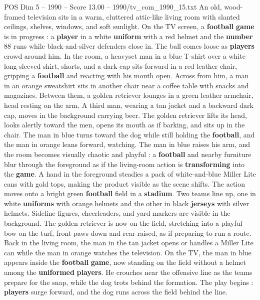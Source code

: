 \begin{textsample}{POS Dim 5 – 1990 – Score 13.00 – 1990/tv\_com\_1990\_15.txt}  \label{ex:f5_pos_007}
An old, wood-framed television sits in a warm, cluttered attic-like living room with slanted ceilings, shelves, windows, and soft sunlight.
On the TV screen, a \textbf{football} \textbf{game} is in progress : a \textbf{player} in a white \textbf{uniform} with a red helmet and the \textbf{number} 88 runs while black-and-silver defenders close in.
The ball comes loose as \textbf{players} crowd around him.
In the room, a heavyset man in a blue T-shirt over a white long-sleeved shirt, shorts, and a dark cap sits forward in a red leather chair, gripping a \textbf{football} and reacting with his mouth open.
Across from him, a man in an orange sweatshirt sits in another chair near a coffee table with snacks and magazines.
Between them, a golden retriever lounges in a green leather armchair, head resting on the arm.
A third man, wearing a tan jacket and a backward dark cap, moves in the background carrying beer.
The golden retriever lifts its head, looks alertly toward the men, opens its mouth as if barking, and sits up in the chair.
The man in blue turns toward the dog while still holding the \textbf{football}, and the man in orange leans forward, watching.
The man in blue raises his arm, and the room becomes visually chaotic and playful : a \textbf{football} and nearby furniture blur through the foreground as if the living-room action is \textbf{transforming} into the \textbf{game}.
A hand in the foreground steadies a pack of white-and-blue Miller Lite cans with gold tops, making the product visible as the scene shifts.
The action moves onto a bright green \textbf{football} field in a \textbf{stadium}.
Two teams line up, one in white \textbf{uniforms} with orange helmets and the other in black \textbf{jerseys} with silver helmets.
Sideline figures, cheerleaders, and yard markers are visible in the background.
The golden retriever is now on the field, stretching into a playful bow on the turf, front paws down and rear raised, as if preparing to run a route.
Back in the living room, the man in the tan jacket opens or handles a Miller Lite can while the man in orange watches the television.
On the TV, the man in blue appears inside the \textbf{football} \textbf{game}, now standing on the field without a helmet among the \textbf{uniformed} \textbf{players}.
He crouches near the offensive line as the teams prepare for the snap, while the dog trots behind the formation.
The play begins : \textbf{players} surge forward, and the dog runs across the field behind the line.

\end{textsample}
